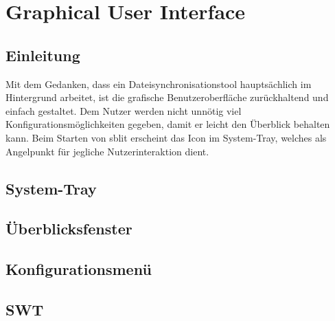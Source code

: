 \chapter{Graphical User Interface}\label{GUI}
\renewcommand{\kapitelautor}{Autor: Andreas Novak}

\section{Einleitung}
Mit dem Gedanken, dass ein Dateisynchronisationstool hauptsächlich im
Hintergrund arbeitet, ist die grafische Benutzeroberfläche zurückhaltend und
einfach gestaltet. Dem Nutzer werden nicht unnötig viel
Konfigurationsmöglichkeiten gegeben, damit er leicht den Überblick behalten
kann. Beim Starten von sblit erscheint das Icon im System-Tray, welches als
Angelpunkt für jegliche Nutzerinteraktion dient.

\section{System-Tray}\label{Systemtray}


\section{Überblicksfenster}\label{Überblicksfenster}


\section{Konfigurationsmenü}\label{Konfigurationsmenü}


\section{SWT}\label{SWT}

